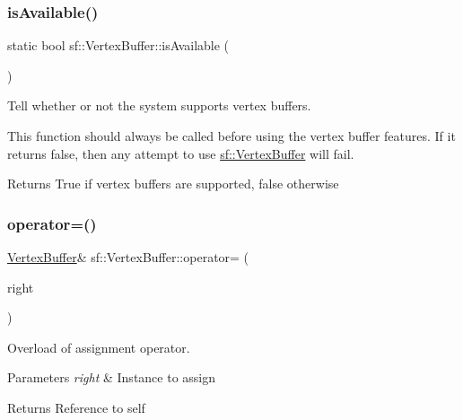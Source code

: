 \subsubsection{\texorpdfstring{isAvailable()}{isAvailable()}}
{\footnotesize\ttfamily static bool sf\+::\+Vertex\+Buffer\+::is\+Available (\begin{DoxyParamCaption}{ }\end{DoxyParamCaption})\hspace{0.3cm}{\ttfamily [static]}}



Tell whether or not the system supports vertex buffers. 

This function should always be called before using the vertex buffer features. If it returns false, then any attempt to use \mbox{\hyperlink{classsf_1_1_vertex_buffer}{sf\+::\+Vertex\+Buffer}} will fail.

\begin{DoxyReturn}{Returns}
True if vertex buffers are supported, false otherwise \begin{DoxyVerb}\end{DoxyVerb}
 
\end{DoxyReturn}
\mbox{\label{classsf_1_1_vertex_buffer_a812f98083da8f10361d457008bf9fa79}} 
\subsubsection{\texorpdfstring{operator=()}{operator=()}}
{\footnotesize\ttfamily \mbox{\hyperlink{classsf_1_1_vertex_buffer}{Vertex\+Buffer}}\& sf\+::\+Vertex\+Buffer\+::operator= (\begin{DoxyParamCaption}\item[{const \mbox{\hyperlink{classsf_1_1_vertex_buffer}{Vertex\+Buffer}} \&}]{right }\end{DoxyParamCaption})}



Overload of assignment operator. 


\begin{DoxyParams}{Parameters}
{\em right} & Instance to assign\\
\hline
\end{DoxyParams}
\begin{DoxyReturn}{Returns}
Reference to self \begin{DoxyVerb}\end{DoxyVerb}
 
\end{DoxyReturn}
\mbox{\label{classsf_1_1_vertex_buffer_a7c429dbef94224a86d605cf4c68aa02d}} 

